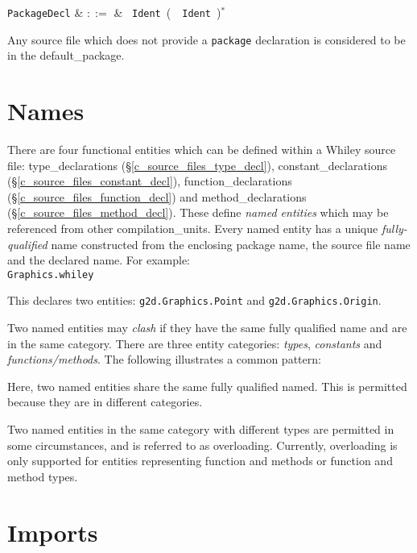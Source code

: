 \begin{syntax}
\verb+PackageDecl+ & $::=$ & \ \verb+Ident+\ \big(\ \ \verb+Ident+\ \big)$^*$\\
\end{syntax}

Any source file which does not provide a \lstinline{package} declaration is considered to be in the \gls{default_package}.

\section{Names}
\label{c_source_files_names}
There are four functional entities which can be defined within a Whiley source file: \gls{type_declaration}s (\S\ref{c_source_files_type_decl}), \gls{constant_declaration}s (\S\ref{c_source_files_constant_decl}), \gls{function_declaration}s (\S\ref{c_source_files_function_decl}) and \gls{method_declaration}s (\S\ref{c_source_files_method_decl}).  These define {\em named entities} which may be referenced from other \gls{compilation_unit}s.  Every named entity has a unique {\em fully-qualified} name constructed from the enclosing package name, the source file name and the declared name.  For example:\\

\noindent \verb+Graphics.whiley+



This declares two entities: \lstinline{g2d.Graphics.Point} and \lstinline{g2d.Graphics.Origin}.  

\noindent Two named entities may {\em clash} if they have the same fully qualified name and are in the same category.  There are three entity categories: {\em types}, {\em constants} and {\em functions/methods}.  The following illustrates a common pattern:



Here, two named entities share the same fully qualified named.  This is permitted because they are in different categories.

Two named entities in the same category with different types are permitted in some circumstances, and is referred to as \gls{overloading}.  Currently, overloading is only supported for entities representing function and methods or function and method types.

\section{Imports}

